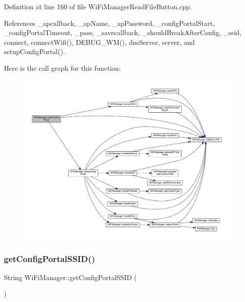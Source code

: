 Definition at line 160 of file Wi\+Fi\+Manager\+Read\+File\+Button.\+cpp.



References \+\_\+apcallback, \+\_\+ap\+Name, \+\_\+ap\+Password, \+\_\+config\+Portal\+Start, \+\_\+config\+Portal\+Timeout, \+\_\+pass, \+\_\+savecallback, \+\_\+should\+Break\+After\+Config, \+\_\+ssid, connect, connect\+Wifi(), D\+E\+B\+U\+G\+\_\+\+W\+M(), dns\+Server, server, and setup\+Config\+Portal().

Here is the call graph for this function\+:
\nopagebreak
\begin{figure}[H]
\begin{center}
\leavevmode
\includegraphics[width=350pt]{d4/dc8/class_wi_fi_manager_afaca5021edffb4d9a5bd39f7b0f7a686_cgraph}
\end{center}
\end{figure}
\mbox{\label{class_wi_fi_manager_a157dc79b810f8f8d338a6120b13f5c94}} 
\subsubsection{\texorpdfstring{get\+Config\+Portal\+S\+S\+I\+D()}{getConfigPortalSSID()}}
{\footnotesize\ttfamily String Wi\+Fi\+Manager\+::get\+Config\+Portal\+S\+S\+ID (\begin{DoxyParamCaption}{ }\end{DoxyParamCaption})}



